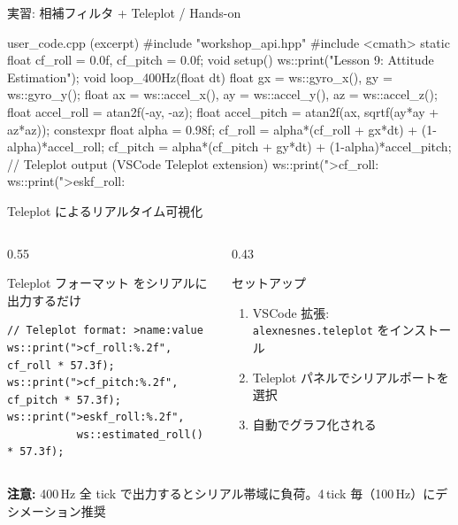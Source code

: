 \begin{frame}[fragile]{実習: 相補フィルタ + Teleplot / Hands-on}
  \vspace{-0.5em}
  \begin{sflisting}[basicstyle=\ttfamily\scriptsize]{user\_code.cpp (excerpt)}
#include "workshop_api.hpp"
#include <cmath>
static float cf_roll = 0.0f, cf_pitch = 0.0f;
void setup() { ws::print("Lesson 9: Attitude Estimation"); }
void loop_400Hz(float dt) {
    float gx = ws::gyro_x(), gy = ws::gyro_y();
    float ax = ws::accel_x(), ay = ws::accel_y(),
          az = ws::accel_z();
    float accel_roll  = atan2f(-ay, -az);
    float accel_pitch = atan2f(ax, sqrtf(ay*ay + az*az));
    constexpr float alpha = 0.98f;
    cf_roll  = alpha*(cf_roll + gx*dt) + (1-alpha)*accel_roll;
    cf_pitch = alpha*(cf_pitch + gy*dt) + (1-alpha)*accel_pitch;
    // Teleplot output (VSCode Teleplot extension)
    ws::print(">cf_roll:%
    ws::print(">eskf_roll:%
}
  \end{sflisting}
\end{frame}

\begin{frame}[fragile]{Teleplot によるリアルタイム可視化}
  \begin{columns}[c]
    \begin{column}{0.55\textwidth}
      \begin{block}{Teleplot フォーマット}
         をシリアルに出力するだけ
      \end{block}
      \begin{lstlisting}[style=sfcpp, basicstyle=\ttfamily\scriptsize]
// Teleplot format: >name:value
ws::print(">cf_roll:%.2f", cf_roll * 57.3f);
ws::print(">cf_pitch:%.2f", cf_pitch * 57.3f);
ws::print(">eskf_roll:%.2f",
           ws::estimated_roll() * 57.3f);
      \end{lstlisting}
    \end{column}
    \begin{column}{0.43\textwidth}
      \begin{exampleblock}{セットアップ}
        \begin{enumerate}
          \item VSCode 拡張: \texttt{alexnesnes.teleplot} をインストール
          \item Teleplot パネルでシリアルポートを選択
          \item 自動でグラフ化される
        \end{enumerate}
      \end{exampleblock}
    \end{column}
  \end{columns}

  \vspace{0.5em}
  {\footnotesize \textbf{注意:} 400\,Hz 全 tick で出力するとシリアル帯域に負荷。4\,tick 毎（100\,Hz）にデシメーション推奨}
\end{frame}

